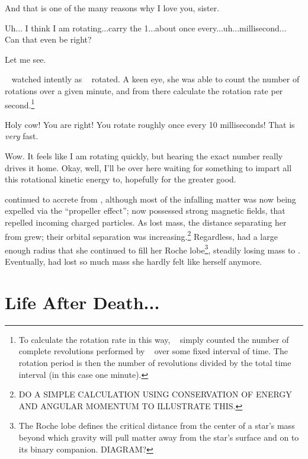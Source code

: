 \documentclass[main.tex]{subfiles}
\begin{document}
\par \Maia And that is one of the many reasons why I love you, sister.  

\par \Merope Uh... I think I am rotating...carry the 1...about once every...uh...millisecond... Can that even be right?

\par \Maia Let me see.

\par \nar \rmmaia~ watched intently as \rmmerope~ rotated.  A keen eye, she was able to count the number of rotations over a given minute, and from there calculate the rotation rate per second.\footnote{To calculate the rotation rate in this way, \rmmaia~  simply counted the number of complete revolutions performed by \rmmerope~ over some fixed interval of time.  The rotation period is then the number of revolutions divided by the total time interval (in this case one minute).}

\par \Maia Holy cow!  You are right! You rotate roughly once every 10 milliseconds!  That is \textit{very} fast.  

\par \Merope Wow.  It feels like I am rotating quickly, but hearing the exact number really drives it home.  Okay, well, I'll be over here waiting for something to impart all this rotational kinetic energy to, hopefully for the greater good. 

\par \nar \rmmerope continued to accrete from \rmmaia, although most of the infalling matter was now being expelled via the ``propeller effect''; \rmmerope now possessed strong magnetic fields, that repelled incoming charged particles.  As \rmmaia lost mass, the distance separating her from \rmmerope grew; their orbital separation was increasing.\footnote{DO A SIMPLE CALCULATION USING CONSERVATION OF ENERGY AND ANGULAR MOMENTUM TO ILLUSTRATE THIS.}  Regardless, \rmmaia had a large enough radius that she continued to fill her Roche lobe\footnote{The Roche lobe defines the critical distance from the center of a star's mass beyond which gravity will pull matter away from the star's surface and on to its binary companion. DIAGRAM?}, steadily losing mass to \rmmerope.  Eventually, \rmmaia had lost so much mass she hardly felt like herself anymore.

\section{Life After Death...}
\end{document}
